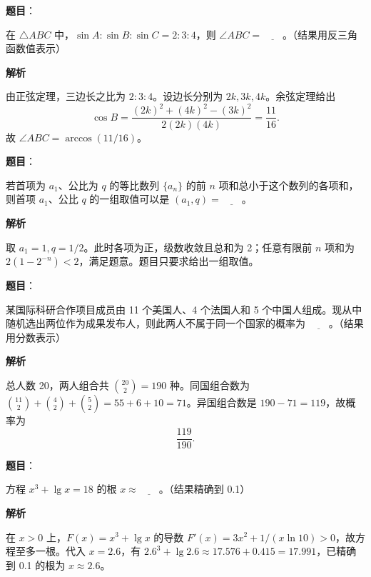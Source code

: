 \begin{answer}

\textbf{题目}：

在 \(\triangle ABC\) 中，\(\sin A:\sin B:\sin C=2:3:4\)，则 \(\angle ABC=\underline{\qquad}\)。（结果用反三角函数值表示）

\textbf{解析}

由正弦定理，三边长之比为 \(2:3:4\)。设边长分别为 \(2k,3k,4k\)。余弦定理给出
\nopagebreak[4]
\[
\cos B=\frac{(2k)^2+(4k)^2-(3k)^2}{2(2k)(4k)}=\frac{11}{16}.
\]
故 \(\angle ABC=\arccos(11/16)\)。


\end{answer}
\begin{answer}

\textbf{题目}：

若首项为 \(a_1\)、公比为 \(q\) 的等比数列 \(\{a_n\}\) 的前 \(n\) 项和总小于这个数列的各项和，则首项 \(a_1\)、公比 \(q\) 的一组取值可以是 \((a_1,q)=\underline{\qquad}\)。

\textbf{解析}

取 \(a_1=1,q=1/2\)。此时各项为正，级数收敛且总和为 2；任意有限前 \(n\) 项和为 \(2(1-2^{-n})<2\)，满足题意。题目只要求给出一组取值。


\end{answer}
\begin{answer}

\textbf{题目}：

某国际科研合作项目成员由 11 个美国人、4 个法国人和 5 个中国人组成。现从中随机选出两位作为成果发布人，则此两人不属于同一个国家的概率为 \(\underline{\qquad}\)。（结果用分数表示）

\textbf{解析}

总人数 20，两人组合共 \(\binom{20}{2}=190\) 种。同国组合数为
\(\binom{11}{2}+\binom42+\binom52=55+6+10=71\)。异国组合数是 \(190-71=119\)，故概率为
\nopagebreak[4]
\[
\frac{119}{190}.
\]


\end{answer}
\begin{answer}

\textbf{题目}：

方程 \(x^3+\lg x=18\) 的根 \(x\approx\underline{\qquad}\)。（结果精确到 0.1）

\textbf{解析}

在 \(x>0\) 上，\(F(x)=x^3+\lg x\) 的导数
\(F'(x)=3x^2+1/(x\ln10)>0\)，故方程至多一根。代入 \(x=2.6\)，有
\(2.6^3+\lg2.6\approx17.576+0.415=17.991\)，已精确到 0.1 的根为 \(x\approx2.6\)。


\end{answer}
